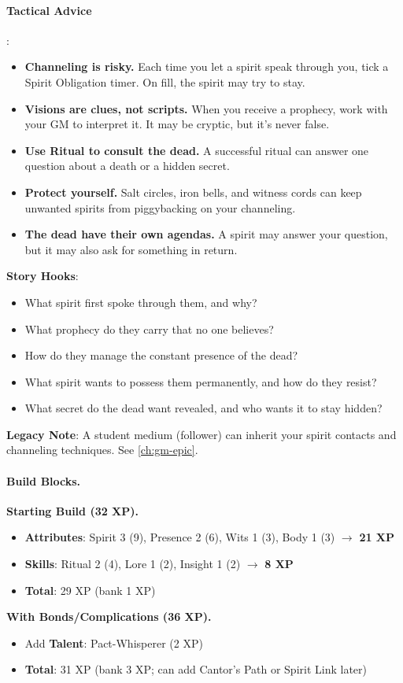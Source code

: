 \paragraph{Tactical Advice}:
\begin{itemize}
\item \textbf{Channeling is risky.} Each time you let a spirit speak through you, tick a Spirit Obligation timer. On fill, the spirit may try to stay.
\item \textbf{Visions are clues, not scripts.} When you receive a prophecy, work with your GM to interpret it. It may be cryptic, but it's never false.
\item \textbf{Use Ritual to consult the dead.} A successful ritual can answer one question about a death or a hidden secret.
\item \textbf{Protect yourself.} Salt circles, iron bells, and witness cords can keep unwanted spirits from piggybacking on your channeling.
\item \textbf{The dead have their own agendas.} A spirit may answer your question, but it may also ask for something in return.
\end{itemize}

\textbf{Story Hooks}:
\begin{itemize}
\item What spirit first spoke through them, and why?
\item What prophecy do they carry that no one believes?
\item How do they manage the constant presence of the dead?
\item What spirit wants to possess them permanently, and how do they resist?
\item What secret do the dead want revealed, and who wants it to stay hidden?
\end{itemize}

\textbf{Legacy Note}: A student medium (follower) can inherit your spirit contacts and channeling techniques. See \ref{ch:gm-epic}.

\paragraph{Build Blocks.}
\textbf{Starting Build (32 XP).}
\begin{itemize}
\item \textbf{Attributes}: Spirit 3 (9), Presence 2 (6), Wits 1 (3), Body 1 (3) \(\rightarrow\) \textbf{21 XP}
\item \textbf{Skills}: Ritual 2 (4), Lore 1 (2), Insight 1 (2) \(\rightarrow\) \textbf{8 XP}
\item \textbf{Total}: 29 XP (bank 1 XP)
\end{itemize}
\textbf{With Bonds/Complications (36 XP).}
\begin{itemize}
\item Add \textbf{Talent}: Pact-Whisperer (2 XP)
\item \textbf{Total}: 31 XP (bank 3 XP; can add Cantor's Path or Spirit Link later)
\end{itemize}


